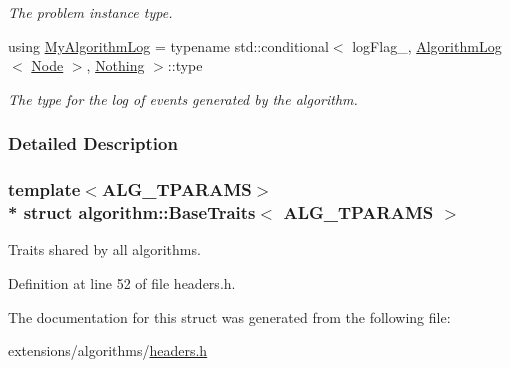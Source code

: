 \begin{DoxyCompactItemize}
\begin{DoxyCompactList}\small\item\em The problem instance type. \end{DoxyCompactList}\item 
using \hyperlink{structalgorithm_1_1BaseTraits_a4cfe4deab94cc6c473b0b20dfbce66fd}{My\+Algorithm\+Log} = typename std\+::conditional$<$ log\+Flag\+\_\+, \hyperlink{structAlgorithmLog}{Algorithm\+Log}$<$ \hyperlink{structalgorithm_1_1BaseTraits_a95cf86d8632b01d605a17c5044d06873}{Node} $>$, \hyperlink{structNothing}{Nothing} $>$\+::type\hypertarget{structalgorithm_1_1BaseTraits_a4cfe4deab94cc6c473b0b20dfbce66fd}{}\label{structalgorithm_1_1BaseTraits_a4cfe4deab94cc6c473b0b20dfbce66fd}

\begin{DoxyCompactList}\small\item\em The type for the log of events generated by the algorithm. \end{DoxyCompactList}\end{DoxyCompactItemize}


\subsubsection{Detailed Description}
\subsubsection*{template$<$A\+L\+G\+\_\+\+T\+P\+A\+R\+A\+MS$>$\\*
struct algorithm\+::\+Base\+Traits$<$ A\+L\+G\+\_\+\+T\+P\+A\+R\+A\+M\+S $>$}

Traits shared by all algorithms. 

Definition at line 52 of file headers.\+h.



The documentation for this struct was generated from the following file\+:\begin{DoxyCompactItemize}
\item 
extensions/algorithms/\hyperlink{extensions_2algorithms_2headers_8h}{headers.\+h}\end{DoxyCompactItemize}
